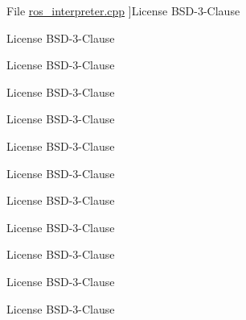\begin{DoxyRefList}
\hypertarget{license__license000065}{}%
File \hyperlink{ros__interpreter_8cpp}{ros\+\_\+interpreter.cpp} ]License B\+S\+D-\/3-\/\+Clause  
\item[\label{license__license000016}%
\hypertarget{license__license000016}{}%
File \hyperlink{ros__interpreter_8hh}{ros\+\_\+interpreter.hh} ]License B\+S\+D-\/3-\/\+Clause  
\item[\label{license__license000057}%
\hypertarget{license__license000057}{}%
File \hyperlink{ros__publish_8cpp}{ros\+\_\+publish.cpp} ]License B\+S\+D-\/3-\/\+Clause  
\item[\label{license__license000021}%
\hypertarget{license__license000021}{}%
File \hyperlink{ros__publish_8hh}{ros\+\_\+publish.hh} ]License B\+S\+D-\/3-\/\+Clause  
\item[\label{license__license000022}%
\hypertarget{license__license000022}{}%
File \hyperlink{ros__publish_8hxx}{ros\+\_\+publish.hxx} ]License B\+S\+D-\/3-\/\+Clause  
\item[\label{license__license000058}%
\hypertarget{license__license000058}{}%
File \hyperlink{ros__queued__subscribe_8cpp}{ros\+\_\+queued\+\_\+subscribe.cpp} ]License B\+S\+D-\/3-\/\+Clause  
\item[\label{license__license000023}%
\hypertarget{license__license000023}{}%
File \hyperlink{ros__queued__subscribe_8hh}{ros\+\_\+queued\+\_\+subscribe.hh} ]License B\+S\+D-\/3-\/\+Clause  
\item[\label{license__license000024}%
\hypertarget{license__license000024}{}%
File \hyperlink{ros__queued__subscribe_8hxx}{ros\+\_\+queued\+\_\+subscribe.hxx} ]License B\+S\+D-\/3-\/\+Clause  
\item[\label{license__license000059}%
\hypertarget{license__license000059}{}%
File \hyperlink{ros__robot__state__publisher_8cpp}{ros\+\_\+robot\+\_\+state\+\_\+publisher.cpp} ]License B\+S\+D-\/3-\/\+Clause  
\item[\label{license__license000025}%
\hypertarget{license__license000025}{}%
File \hyperlink{ros__robot__state__publisher_8hpp}{ros\+\_\+robot\+\_\+state\+\_\+publisher.hpp} ]License B\+S\+D-\/3-\/\+Clause  
\item[\label{license__license000060}%
\hypertarget{license__license000060}{}%
File \hyperlink{ros__robot__state__publisher__mt_8cpp}{ros\+\_\+robot\+\_\+state\+\_\+publisher\+\_\+mt.cpp} ]License B\+S\+D-\/3-\/\+Clause  
\item[\label{license__license000026}%
\hypertarget{license__license000026}{}%
File \hyperlink{ros__robot__state__publisher__mt_8hpp}{ros\+\_\+robot\+\_\+state\+\_\+publisher\+\_\+mt.hpp} ]License B\+S\+D-\/3-\/\+Clause  

\end{DoxyRefList}

